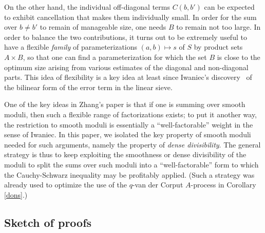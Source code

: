 \documentclass[12pt,a4paper,reqno]{amsart}
\numberwithin{equation}{section}
\theoremstyle{plain}
\theoremstyle{definition}
\begin{document}
\par
On the other hand, the individual off-diagonal terms $C(b,b')$ can be
expected to exhibit cancellation that makes them individually small. In
order for the sum over $b\neq b'$ to remain of manageable size, one
needs $B$ to remain not too large. In order to balance the two
contributions, it turns out to be extremely useful to have a flexible
\emph{family} of parameterizations $(a,b) \mapsto s$ of $S$ by product
sets $A \times B$, so that one can find a parameterization for which
the set $B$ is close to the optimum size arising from various
estimates of the diagonal and non-diagonal parts. This idea of
flexibility is a key idea at least since Iwaniec's
discovery~\cite{iwaniec} of the bilinear form of the error term in
the linear sieve.
\par
One of the key ideas in Zhang's paper \cite{zhang} is that if one is
summing over smooth moduli, then such a flexible range of
factorizations exists; to put it another way, the restriction to
smooth moduli is essentially a ``well-factorable'' weight in the sense
of Iwaniec.  In this paper, we isolated the key property of smooth
moduli needed for such arguments, namely the property of \emph{dense
  divisibility}. %
The general strategy is thus to keep exploiting
the smoothness or dense divisibility of the moduli to split the sums
over such moduli into a ``well-factorable'' form to which the
Cauchy-Schwarz inequality may be profitably applied. (Such a strategy
was already used to optimize the use of the $q$-van der Corput
$A$-process in Corollary \ref{dons}.)

\subsection{Sketch of proofs}\label{typei-ii-sketch}
\end{document}
